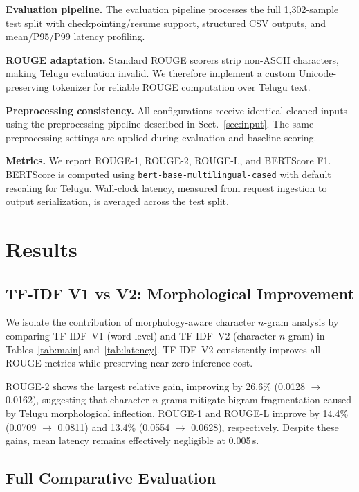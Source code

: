 \documentclass[runningheads]{llncs}
\begin{document}
\textbf{Evaluation pipeline.}
The evaluation pipeline processes the full 1,302-sample
test split with checkpointing/resume support, structured
CSV outputs, and mean/P95/P99 latency profiling.

\textbf{ROUGE adaptation.}
Standard ROUGE scorers strip non-ASCII characters,
making Telugu evaluation invalid. We therefore implement
a custom Unicode-preserving tokenizer for reliable
ROUGE computation over Telugu text.

\textbf{Preprocessing consistency.}
All configurations receive identical cleaned inputs using
the preprocessing pipeline described in
Sect.~\ref{sec:input}. The same preprocessing settings
are applied during evaluation and baseline scoring.

\textbf{Metrics.}
We report ROUGE-1, ROUGE-2, ROUGE-L, and BERTScore F1.
BERTScore is computed using
\texttt{bert-base-multilingual-cased} with default
rescaling for Telugu. Wall-clock latency, measured from
request ingestion to output serialization, is averaged
across the test split.

\section{Results}
\label{sec:results}

\subsection{TF-IDF V1 vs V2: Morphological Improvement}

We isolate the contribution of morphology-aware
character $n$-gram analysis by comparing TF-IDF~V1
(word-level) and TF-IDF~V2 (character $n$-gram) in
Tables~\ref{tab:main} and~\ref{tab:latency}. TF-IDF~V2
consistently improves all ROUGE metrics while preserving
near-zero inference cost.

ROUGE-2 shows the largest relative gain, improving by
26.6\% (0.0128 $\rightarrow$ 0.0162), suggesting that
character $n$-grams mitigate bigram fragmentation caused
by Telugu morphological inflection. ROUGE-1 and
ROUGE-L improve by 14.4\% (0.0709 $\rightarrow$ 0.0811)
and 13.4\% (0.0554 $\rightarrow$ 0.0628), respectively.
Despite these gains, mean latency remains effectively
negligible at 0.005\,s.

\subsection{Full Comparative Evaluation}
\end{document}
